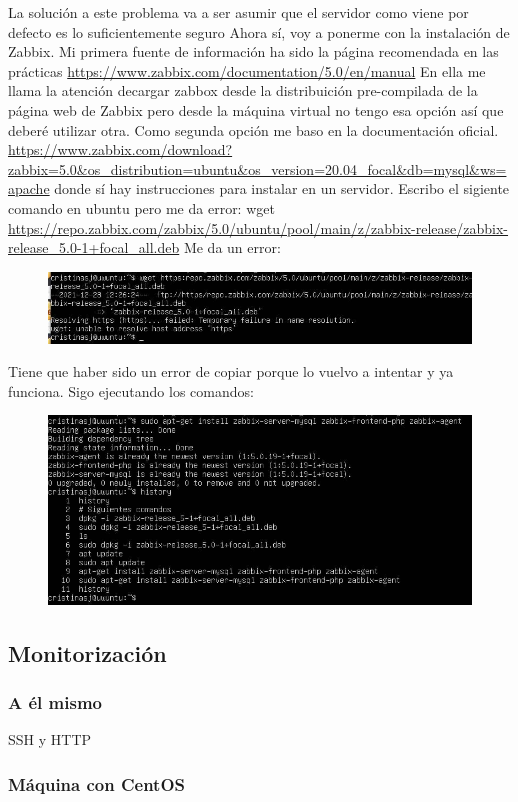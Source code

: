 La solución a este problema va a ser asumir que el servidor como viene por defecto es lo suficientemente seguro  
\newline
Ahora sí, voy a ponerme con la instalación de Zabbix. Mi primera fuente de información ha sido la página recomendada en las prácticas \url{https://www.zabbix.com/documentation/5.0/en/manual} 
\newline
En ella me llama la atención decargar zabbox desde la distribuición pre-compilada de la página web de Zabbix pero desde la máquina virtual no tengo esa opción así que deberé utilizar otra. 
\newline
Como segunda opción me baso en la documentación oficial. \url{https://www.zabbix.com/download?zabbix=5.0&os_distribution=ubuntu&os_version=20.04_focal&db=mysql&ws=apache} donde sí hay instrucciones para instalar en un servidor. 
\newline
Escribo el sigiente comando en ubuntu pero me da error: 
wget \url{https://repo.zabbix.com/zabbix/5.0/ubuntu/pool/main/z/zabbix-release/zabbix-release_5.0-1+focal_all.deb}
\newline
Me da un error:
\begin{figure}[H]
\centering
\includegraphics{Error1.jpg}
\end{figure} 
Tiene que haber sido un error de copiar porque lo vuelvo a intentar y ya funciona.
Sigo ejecutando los comandos: 
\begin{figure}[H]
\centering
\includegraphics{instalacionhecha.jpg}
\end{figure} 


\subsection{Monitorización}
\subsubsection{A él mismo}
SSH y HTTP
\subsubsection{Máquina con CentOS}
\newpage

